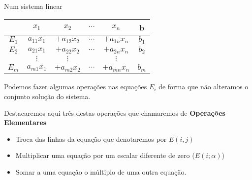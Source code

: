 \documentclass{beamer}
\begin{document}
\begin{frame}
Num sistema linear 

\begin{tabular}{|c|cccc|c|} \hline 
  & $x_1$ & $x_2$ & $\cdots $ & $x_n$ & b \\ \hline
  $E_1$ & $a_{11}x_1$ & $+a_{12}x_2$ & $\cdots $ &$+a_{1n}x_n$ &$b_1$ \\
  $E_2$ & $a_{21}x_1$ & $+a_{22}x_2$& $\cdots $ &$+a_{2n}x_n $&$b_2$ \\
        &     $\vdots$       &    $\vdots$         &         & $\vdots$ &  \\
  $E_m$ & $a_{m1}x_1$ & $+a_{m2}x_2$& $\cdots $ &$+a_{mn}x_n$ &$b_m$ \\ \hline
\end{tabular}

Podemos fazer algumas operações nas equações $E_i$ de forma que não alteramos o conjunto solução do sistema.

\pause 

Destacaremos aqui três destas operações que chamaremos de \textbf{Operações Elementares} 
\begin{itemize}
  \item Troca das linhas da equação que denotaremos por $E(i,j)$ 
  \item Multiplicar uma equação por um escalar diferente de zero ($E(i;\alpha)$)
  \item Somar a uma equação o múltiplo de uma outra equação.

\end{itemize}
\end{frame}
\end{document}
